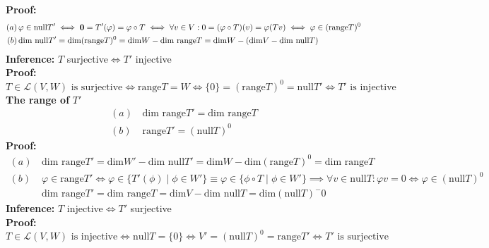 \documentclass{article}
\newcommand{\0}{{\bf{0}}}
\begin{document}
\textbf{Proof:}
\begin{equation}
\begin{split}
    (a)\,&\varphi\in\mbox{null}T'\iff\0=T'(\varphi)=\varphi\circ T\iff\forall v\in V:0=(\varphi\circ T)(v)=\varphi(Tv)\iff\varphi\in(\mbox{range}T)^0\\
    (b)\,&\mbox{dim null}T'=\mbox{dim}(\mbox{range}T)^0=\mbox{dim}W-\mbox{dim range}T=\mbox{dim}W-(\mbox{dim}V-\mbox{dim null}T)
\end{split}
\end{equation}
\textbf{Inference:} $T$ surjective$\iff T'$ injective\\
\textbf{Proof:}
$$T\in\mathcal{L}(V,W)\mbox{ is surjective}\iff\mbox{range}T=W\iff\{0\}=(\mbox{range}T)^0=\mbox{null}T'\iff T'\mbox{ is injective}$$
\textbf{The range of} $T'$
\begin{equation}
\begin{split}
    (a)\,&\mbox{dim range}T'=\mbox{dim range}T\\
    (b)\,&\mbox{range}T'=(\mbox{null}T)^0
\end{split}
\end{equation}
\textbf{Proof:}
\begin{equation}
\begin{split}
    (a)\,&\mbox{dim range}T'=\mbox{dim}W'-\mbox{dim null}T'=\mbox{dim}W-\mbox{dim}(\mbox{range}T)^0=\mbox{dim range}T\\
    (b)\,&\varphi\in\mbox{range}T'\iff\varphi\in\{T'(\phi)\mid\phi\in W'\}\equiv\varphi\in\{\phi\circ T\mid\phi\in W'\}\implies\forall v\in\mbox{null}T:\varphi v=0\iff\varphi\in(\mbox{null}T)^0\\
    &\mbox{dim range}T'=\mbox{dim range}T=\mbox{dim}V-\mbox{dim null}T=\mbox{dim}(\mbox{null}T)^-0
\end{split}
\end{equation}
\textbf{Inference:} $T$ injective$\iff T'$ surjective\\
\textbf{Proof:}
$$T\in\mathcal{L}(V,W)\mbox{ is injective}\iff\mbox{null}T=\{0\}\iff V'=(\mbox{null}T)^0=\mbox{range}T'\iff T'\mbox{ is surjective}$$
\end{document}
